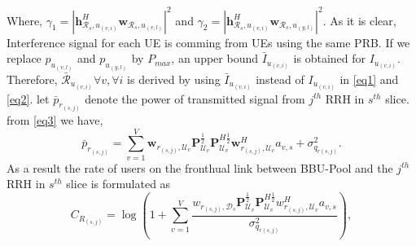 \documentclass[conference]{IEEEtran}
\begin{document}
Where, $\gamma_{1} =|\boldsymbol{h}_{\mathcal{R}_s, u_{(v,i)}}^H \boldsymbol{w}_{\mathcal{R}_{s},u_{(v,l)}}|^2$
and $\gamma_{2} =|\boldsymbol{h}_{\mathcal{R}_s, u_{(v,i)}}^H \boldsymbol{w}_{\mathcal{R}_{s},u_{(y,l)}}|^2$.
As it is clear, Interference signal for each UE is comming from UEs using the same PRB.
If we replace $p_{u_{(v,l)}}$ and $p_{u_{(y,l)}}$ by $P_{max}$, an upper bound $\bar{I}_{u_{(v,i)}}$ is obtained for $I_{u_{(v,i)}}$. Therefore, $\bar{\mathcal{R}}_{u_{(v,i)}} \forall v , \forall i$ is derived by using $\bar{I}_{u_{(v,i)}}$ instead of $I_{u_{(v,i)}}$ in  \eqref{eq1} and \eqref{eq2}.\newline
let $\bar{p}_{r_{(s,j)}}$ denote the power of transmitted signal from $j^{th}$ RRH in $s^{th}$ slice.
from \eqref{eq3} we have,
\begin{equation}
\bar{p}_{r_{(s,j)}} = \sum_{v=1}^{V}\boldsymbol{w}_{r_{(s,j)},\mathcal{U}_{v}} \boldsymbol{P}_{\mathcal{U}_v}^{\frac{1}{2}} \boldsymbol{P}_{\mathcal{U}_v}^{H \frac{1}{2}}   \boldsymbol{w}_{r_{(s,j)},\mathcal{U}_{v}}^H a_{v,s} + \sigma_{q_{r(s,j)}}^2.
\end{equation}
As a result the rate of users on the fronthual link between BBU-Pool and the $j^{th}$ RRH in $s^{th}$ slice is formulated as 
\begin{equation}
C_{R_{(s,j)}} = \log{(1+\sum_{v=1}^{V}\frac{w_{r_{(s,j)},\mathcal{D}_{s}} \boldsymbol{P}_{\mathcal{U}_v}^{\frac{1}{2}} \boldsymbol{P}_{\mathcal{U}_v}^{H \frac{1}{2}}   w_{r_{(s,j)},\mathcal{U}_{v}}^H a_{v,s}}{ \sigma_{q_{r(s,j)}}^2})},
\end{equation}
\end{document}
